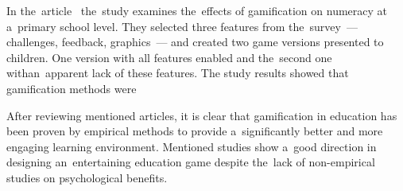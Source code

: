 In the~article~\cite{nand_2019_engaging} the~study examines the~effects of gamification on numeracy at a~primary school level.
They selected three features from the~survey~--- challenges, feedback, graphics~--- and created two game versions presented to children.
One version with all features enabled and the~second one with\linebreak{}an~apparent lack of these features.
The study results showed that gamification \mbox{methods} were 

After reviewing mentioned articles, it is clear that gamification in education has been proven by empirical methods to provide a~significantly better and more engaging learning environment.
Mentioned studies show a~good direction in designing an~entertaining education game despite the~lack of \mbox{non-empirical} studies on psychological benefits.
